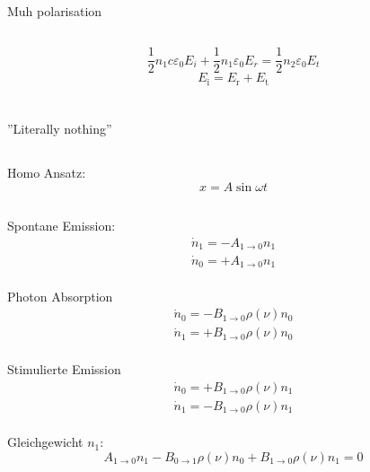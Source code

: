\documentclass[12pt]{report}
\newcommand{\vepsilon}{\varepsilon}
\begin{document}
\subsection{}

\subsection{}
Muh polarisation

\subsection{}

\[\frac{1}{2}n_1c\vepsilon_0E_i+\frac{1}{2}n_1\vepsilon_0E_r=\frac{1}{2}n_2\vepsilon_0E_t\]
\[E_\mathrm{i}=E_\mathrm{r}+E_\mathrm{t}\]

\subsection{}

\section{}

\subsection{}
''Literally nothing''

\subsection{}
Homo Ansatz: \[x=A\sin\omega t\]

\subsection{}
Spontane Emission: \begin{align*}\dot{n}_1=-A_{1\to0}n_1\\\dot{n}_0=+A_{1\to0}n_1\end{align*}\\
Photon Absorption\begin{align*}\dot{n}_0=-B_{1\to0}\rho(\nu)n_0\\\dot{n}_1=+B_{1\to0}\rho(\nu)n_0\end{align*}\\
Stimulierte Emission\begin{align*}\dot{n}_0=+B_{1\to0}\rho(\nu)n_1\\\dot{n}_1=-B_{1\to0}\rho(\nu)n_1\end{align*}\\
Gleichgewicht $n_1$:
\[A_{1\to0}n_1-B_{0\to1}\rho(\nu)n_0+B_{1\to0}\rho(\nu)n_1=0\]
\end{document}
